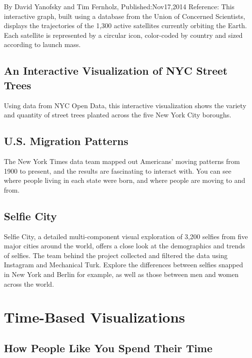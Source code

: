 \documentclass[]{book}
\theoremstyle{definition}
\theoremstyle{definition}
\theoremstyle{definition}
\theoremstyle{remark}
\begin{document}
By David Yanofsky and Tim Fernholz, Published:Nov17,2014 Reference:
\citep{Satellite} This interactive graph, built using a database from
the Union of Concerned Scientists, displays the trajectories of the
1,300 active satellites currently orbiting the Earth. Each satellite is
represented by a circular icon, color-coded by country and sized
according to launch mass.

\subsection{An Interactive Visualization of NYC Street
Trees}\label{an-interactive-visualization-of-nyc-street-trees}

\citep{trees} Using data from NYC Open Data, this interactive
visualization shows the variety and quantity of street trees planted
across the five New York City boroughs.

\subsection{U.S. Migration Patterns}\label{u.s.-migration-patterns}

The New York Times data team mapped out Americans' moving patterns from
1900 to present, and the results are fascinating to interact with. You
can see where people living in each state were born, and where people
are moving to and from. \citep{migration}

\subsection{Selfie City}\label{selfie-city}

\citep{selfie} Selfie City, a detailed multi-component visual
exploration of 3,200 selfies from five major cities around the world,
offers a close look at the demographics and trends of selfies. The team
behind the project collected and filtered the data using Instagram and
Mechanical Turk. Explore the differences between selfies snapped in New
York and Berlin for example, as well as those between men and women
across the world.

\section{Time-Based Visualizations}\label{time-based-visualizations}

\subsection{How People Like You Spend Their
Time}\label{how-people-like-you-spend-their-time}
\end{document}
